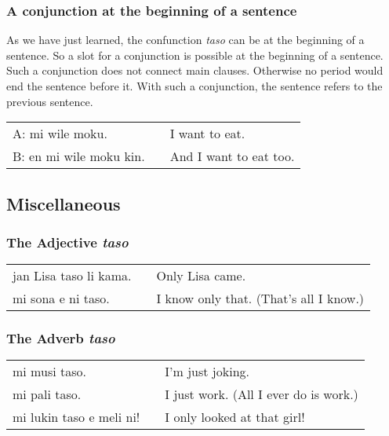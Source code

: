\subsubsection*{A conjunction at the beginning of a sentence}

As we have just learned, the confunction \textit{taso} can be at the beginning of a sentence.
So a slot for a conjunction is possible at the beginning of a sentence.
Such a conjunction does not connect main clauses.
Otherwise no period would end the sentence before it.
With such a conjunction, the sentence refers to the previous sentence.

\begin{supertabular}{p{5,5cm}|ll}
    A: mi wile moku.        &  & I want to eat.         \\
    B: en mi wile moku kin. &  & And I want to eat too. \\
\end{supertabular}

\subsection*{Miscellaneous}
\subsubsection*{The Adjective \textit{taso}}

\begin{supertabular}{p{5,5cm}|ll}
    jan Lisa taso li kama. &  & Only Lisa came.                        \\
    mi sona e ni taso.     &  & I know only that. (That's all I know.) \\
\end{supertabular}

\subsubsection*{The Adverb \textit{taso}}

\begin{supertabular}{p{5,5cm}|ll}
    mi musi taso.            &  & I'm just joking.                      \\
    mi pali taso.            &  & I just work. (All I ever do is work.) \\
    mi lukin taso e meli ni! &  & I only looked at that girl!           \\
\end{supertabular}

